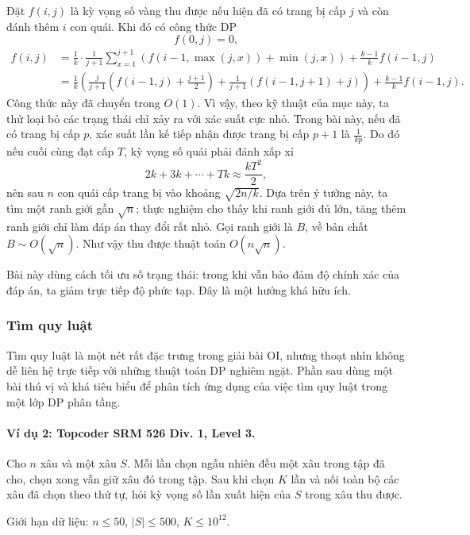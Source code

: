 \documentclass[11pt]{article}
\begin{document}
Đặt \(f(i,j)\) là kỳ vọng số vàng thu được nếu hiện đã có trang bị cấp \(j\) và
còn đánh thêm \(i\) con quái. Khi đó có công thức DP
\[
  f(0,j)=0,
\]
\[
\begin{aligned}
f(i,j)
&=\frac{1}{k}\cdot\frac{1}{j+1}\sum_{x=1}^{j+1}
  \left(f(i-1,\max(j,x))+\min(j,x)\right)
  +\frac{k-1}{k}f(i-1,j)\\
&=\frac{1}{k}\left(
  \frac{j}{j+1}\left(f(i-1,j)+\frac{j+1}{2}\right)
  +\frac{1}{j+1}\left(f(i-1,j+1)+j\right)\right)
  +\frac{k-1}{k}f(i-1,j).
\end{aligned}
\]
Công thức này đã chuyển trong \(O(1)\). Vì vậy, theo kỹ thuật của mục này, ta
thử loại bỏ các trạng thái chỉ xảy ra với xác suất cực nhỏ. Trong bài này, nếu
đã có trang bị cấp \(p\), xác suất lần kế tiếp nhận được trang bị cấp \(p+1\)
là \(\frac{1}{kp}\). Do đó nếu cuối cùng đạt cấp \(T\), kỳ vọng số quái phải
đánh xấp xỉ
\[
  2k+3k+\cdots+Tk \approx \frac{kT^2}{2},
\]
nên sau \(n\) con quái cấp trang bị vào khoảng \(\sqrt{2n/k}\). Dựa trên ý
tưởng này, ta tìm một ranh giới gần \(\sqrt n\); thực nghiệm cho thấy khi ranh
giới đủ lớn, tăng thêm ranh giới chỉ làm đáp án thay đổi rất nhỏ. Gọi ranh giới
là \(B\), về bản chất \(B\sim O(\sqrt n)\). Như vậy thu được thuật toán
\(O(n\sqrt n)\).

Bài này dùng cách tối ưu số trạng thái: trong khi vẫn bảo đảm độ chính xác của
đáp án, ta giảm trực tiếp độ phức tạp. Đây là một hướng khá hữu ích.

\subsubsection{Tìm quy luật}

Tìm quy luật là một nét rất đặc trưng trong giải bài OI, nhưng thoạt nhìn không
dễ liên hệ trực tiếp với những thuật toán DP nghiêm ngặt. Phần sau dùng một bài
thú vị và khá tiêu biểu để phân tích ứng dụng của việc tìm quy luật trong một
lớp DP phân tầng.

\paragraph{Ví dụ 2: Topcoder SRM 526 Div. 1, Level 3.}
Cho \(n\) xâu và một xâu \(S\). Mỗi lần chọn ngẫu nhiên đều một xâu trong tập
đã cho, chọn xong vẫn giữ xâu đó trong tập. Sau khi chọn \(K\) lần và nối toàn
bộ các xâu đã chọn theo thứ tự, hỏi kỳ vọng số lần xuất hiện của \(S\) trong
xâu thu được.

Giới hạn dữ liệu: \(n\le 50\), \(|S|\le 500\), \(K\le 10^{12}\).
\end{document}
